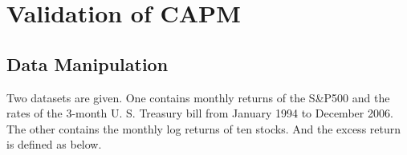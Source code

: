 \documentclass[11pt, conference]{IEEEtran}
\begin{document}


%
%




\section{Validation of CAPM}
\subsection{Data Manipulation}
Two datasets are given.  One contains monthly returns of the S\&P500 and the rates of the 3-month U. S. Treasury bill from January 1994 to December 2006. The other contains the monthly log returns of ten stocks. And the excess return is defined as below. 
\end{document}
